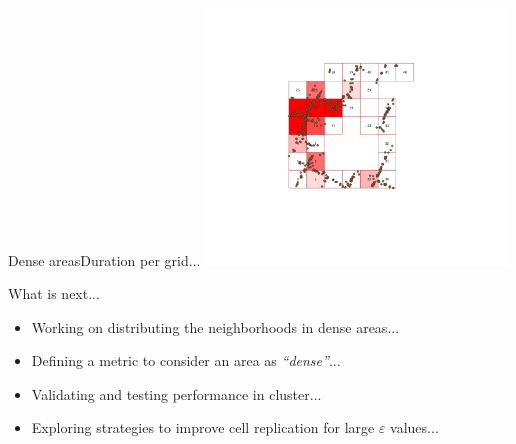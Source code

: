 \documentclass{beamer}
\begin{document}
\begin{frame}{Dense areas}{Duration per grid...}
    \centering
    \includegraphics[trim={300 300 300 210}, clip, width=0.6\textwidth]{figures/cell518_grid_times}
\end{frame}

\begin{frame}{What is next...}
        \begin{itemize}
                \item Working on distributing the neighborhoods in dense areas...
                \item Defining a metric to consider an area as \textit{``dense''}...
                \item Validating and testing performance in cluster...
                \item Exploring strategies to improve cell replication for large $\varepsilon$ values...
        \end{itemize}
\end{frame}
\end{document}
